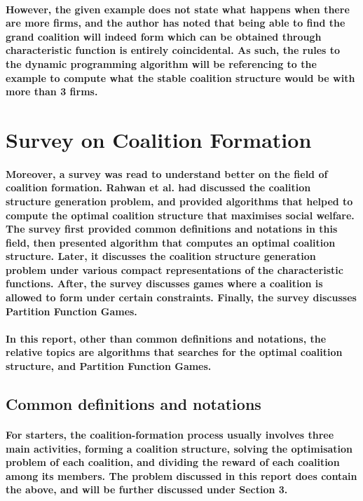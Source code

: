 \documentclass[11pt]{report}
\begin{document}
\paragraph{However, the given example does not state what happens when there are more firms, and the author has noted that being able to find the grand coalition will indeed form which can be obtained through characteristic function is entirely coincidental. As such, the rules to the dynamic programming algorithm will be referencing to the example to compute what the stable coalition structure would be with more than 3 firms.}

\section{Survey on Coalition Formation}

\paragraph{Moreover, a survey was read to understand better on the field of coalition formation. Rahwan et al. \cite{rahwan2015coalition} had discussed the coalition structure generation problem, and provided algorithms that helped to compute the optimal coalition structure that maximises social welfare. The survey first provided common definitions and notations in this field, then presented algorithm that computes an optimal coalition structure. Later, it discusses the coalition structure generation problem under various compact representations of the characteristic functions. After, the survey discusses games where a coalition is allowed to form under certain constraints. Finally, the survey discusses Partition Function Games. }
\paragraph{In this report, other than common definitions and notations, the relative topics are algorithms that searches for the optimal coalition structure, and Partition Function Games.}
\subsection{Common definitions and notations}
\paragraph{For starters, the coalition-formation process usually involves three main activities, forming a coalition structure, solving the optimisation problem of each coalition, and dividing the reward of each coalition among its members. The problem discussed in this report does contain the above, and will be further discussed under Section 3. }
\end{document}
